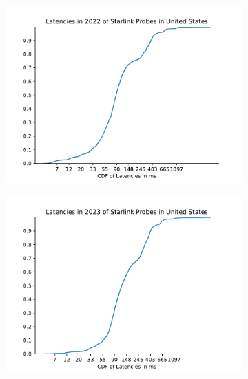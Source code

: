 \begin{figure}
	\centering
	\begin{subfigure}[b]{0.3\linewidth}
		\includegraphics[width=\linewidth]{chapters/4-results/latency/img/cdf_latencies_in_2022_of_starlink_probes_in_united_states.pdf}
	\end{subfigure}
	\begin{subfigure}[b]{0.3\linewidth}
		\includegraphics[width=\linewidth]{chapters/4-results/latency/img/cdf_latencies_in_2023_of_starlink_probes_in_united_states.pdf}
	\end{subfigure}
	\begin{subfigure}[b]{0.3\linewidth}

\end{subfigure}
\end{figure}
